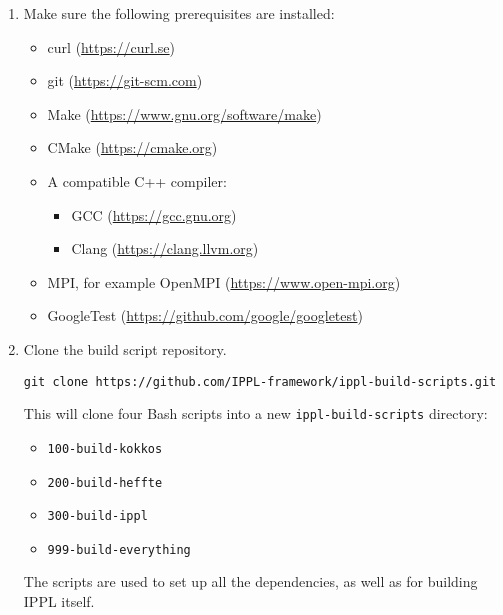 \begin{enumerate}
    \item Make sure the following prerequisites are installed:

          \begin{itemize}
              \item curl (\href{https://curl.se}{https://curl.se})
              \item git (\href{https://git-scm.com}{https://git-scm.com})
              \item Make (\href{https://www.gnu.org/software/make}{https://www.gnu.org/software/make})
              \item CMake (\href{https://cmake.org}{https://cmake.org})
              \item A compatible C++ compiler:
                    \begin{itemize}
                        \item GCC (\href{https://gcc.gnu.org}{https://gcc.gnu.org})
                        \item Clang (\href{https://clang.llvm.org}{https://clang.llvm.org})
                    \end{itemize}
              \item MPI, for example OpenMPI (\href{https://www.open-mpi.org}{https://www.open-mpi.org})
              \item GoogleTest (\href{https://github.com/google/googletest}{https://github.com/google/googletest})
          \end{itemize}

    \item Clone the build script repository.

          \texttt{git clone https://github.com/IPPL-framework/ippl-build-scripts.git}

          This will clone four Bash scripts into a new \texttt{ippl-build-scripts} directory:

          \begin{itemize}
              \item \texttt{100-build-kokkos}
              \item \texttt{200-build-heffte}
              \item \texttt{300-build-ippl}
              \item \texttt{999-build-everything}
          \end{itemize}

          The scripts are used to set up all the dependencies, as well as for building IPPL itself.


\end{enumerate}
